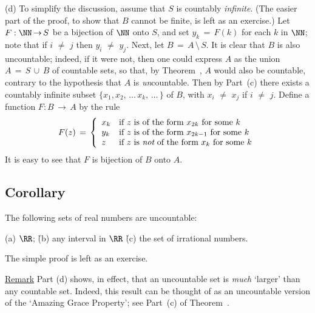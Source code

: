 {        (d) To simplify the discussion, assume that $S$ is countably {\em infinite}.
    (The easier part of the proof, to show that $B$ cannot be finite, is left as an exercise.)
    Let $F:{\NN} \,{\rightarrow}\, S$ be a bijection of ${\NN}$ onto $S$, and set $y_{k} \,=\, F(k)$ for each $k$ in ${\NN}$;
    note that if $i \,\,{\neq}\,\, j$ then $y_{i} \,\,{\neq}\,\, y_{j}$.
    Next, let $B \,=\, A\,{\setminus}\,S$. It is clear that $B$ is also uncountable;
    indeed, if it were not, then one could express $A$ as the union $A \,=\, S\,{\cup}\,B$ of countable sets,
    so that, by Theorem~, $A$ would also be countable, contrary to the hypothesis that $A$ is {\em un}countable.
    Then by Part~(c) there exists a countably infinite subset $\{x_{1}, x_{2},\,{\ldots}\,x_{k},\,{\ldots}\,\}$ of $B$, with $x_{i} \,\,{\neq}\,\, x_{j}$ if $i \,\,{\neq}\,\, j$.
    Define a function $F:B \,{\rightarrow}\, A$ by the rule
        \begin{displaymath}
        F(z) \,=\, \left\{
        \begin{array}{ll}
        x_{k} & \mbox{if $z$ is of the form $x_{2k}$ for some $k$}         \\
        y_{k} & \mbox{if $z$ is of the form $x_{2k-1}$ for some $k$}       \\
        z     & \mbox{if $z$ is {\em not} of the form $x_{k}$ for some $k$}
        \end{array}
        \right.
        \end{displaymath}
\noindent It is easy to see that $F$ is bijection of $B$ onto $A$.



            \subsection{\small{\bf Corollary}}
            \label{CorA20.115}

\V

        The following sets of real numbers are uncountable:

        (a) ${\RR}$; \h (b) any interval in ${\RR}$ \h (c) the set of irrational numbers.

\V

       The simple proof is left as an exercise.
 

\V

        \underline{Remark} Part (d) shows, in effect, that an uncountable set is {\em much} `larger' than any countable set.
    Indeed, this result can be thought of as an uncountable version of the `Amazing Grace Property'; see Part~(c) of Theorem~.

}
